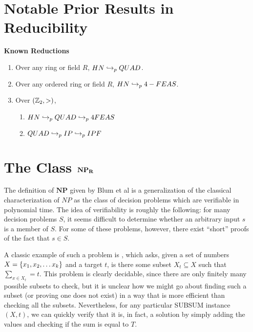 \section{Notable Prior Results in Reducibility}

\begin{theorem}{\textbf{Known Reductions}}
  \begin{enumerate}
  \item Over any ring or field $R$, $HN \hookrightarrow_p QUAD$.
  \item Over any ordered ring or field $R$, $HN \hookrightarrow_p 4-FEAS$.
  \item Over $(\mathbb{Z}_2, >)$, 
    \begin{enumerate}
    \item $HN \hookrightarrow_p QUAD \hookrightarrow_p 4FEAS$
    \item $QUAD \hookrightarrow_p IP \hookrightarrow_p IPF$
    \end{enumerate}
  \end{enumerate}
\end{theorem}

\section{The Class $\mathbf{NP_R}$}

The definition of $\mathbf{NP}$ given by Blum et al is a
generalization of the classical characterization of $NP$ as the class
of decision problems which are verifiable in polynomial time.  The
idea of verifiability is roughly the following: for many decision
problems $S$, it seems difficult to determine whether an arbitrary
input $s$ is a member of $S$.  For some of these problems, however,
there exist ``short'' proofs of the fact that $s \in S$.

A classic example of such a problem is \subsum, which asks, given a
set of numbers $X = \{x_1, x_2, \ldots x_k\}$ and a target $t$, is
there some subset $X_t \subseteq X$ such that $\sum_{x \in X_t} = t$.
This problem is clearly decidable, since there are only finitely many
possible subsets to check, but it is unclear how we might go about
finding such a subset (or proving one does not exist) in a way that is
more efficient than checking all the subsets.  Nevertheless, for any
particular SUBSUM instance $(X, t)$, we can quickly verify that it is, in
fact, a solution by simply adding the values and checking if the sum
is equal to $T$.\\

